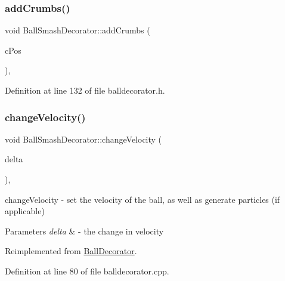 \subsubsection{\texorpdfstring{add\+Crumbs()}{addCrumbs()}}
{\footnotesize\ttfamily void Ball\+Smash\+Decorator\+::add\+Crumbs (\begin{DoxyParamCaption}\item[{Q\+PointF}]{c\+Pos }\end{DoxyParamCaption})\hspace{0.3cm}{\ttfamily [inline]}, {\ttfamily [protected]}}



Definition at line 132 of file balldecorator.\+h.

\mbox{\label{class_ball_smash_decorator_ad59848156e8eabad3e561a1d113f7029}} 
\subsubsection{\texorpdfstring{change\+Velocity()}{changeVelocity()}}
{\footnotesize\ttfamily void Ball\+Smash\+Decorator\+::change\+Velocity (\begin{DoxyParamCaption}\item[{const Q\+Vector2D \&}]{delta }\end{DoxyParamCaption})\hspace{0.3cm}{\ttfamily [override]}, {\ttfamily [virtual]}}



change\+Velocity -\/ set the velocity of the ball, as well as generate particles (if applicable) 


\begin{DoxyParams}{Parameters}
{\em delta} & -\/ the change in velocity \\
\hline
\end{DoxyParams}


Reimplemented from \mbox{\hyperlink{class_ball_decorator_a3e4f4d31f6409f018b8b337bcf2bd284}{Ball\+Decorator}}.



Definition at line 80 of file balldecorator.\+cpp.

\mbox{\label{class_ball_smash_decorator_a017998926f2b3ebdfcf49e074ea86aae}} 
